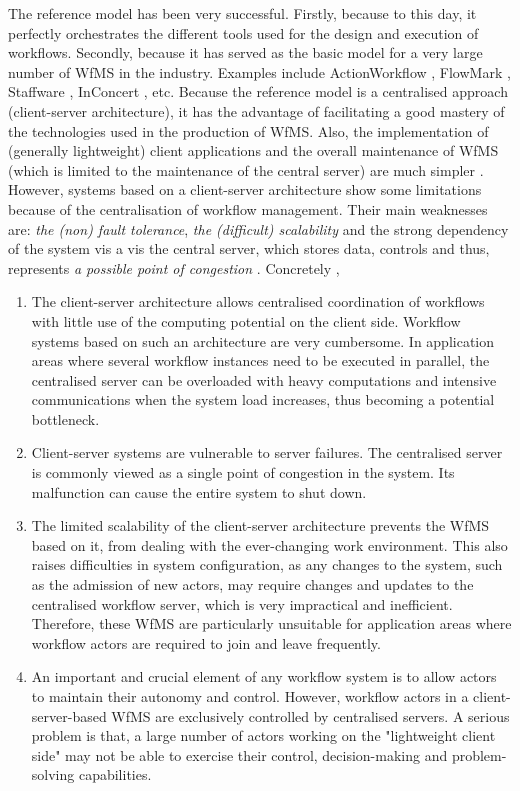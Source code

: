 The reference model has been very successful. Firstly, because to this day, it perfectly orchestrates the different tools used for the design and execution of workflows. Secondly, because it has served as the basic model for a very large number of WfMS in the industry. Examples include ActionWorkflow \cite{actionWorkflow}, FlowMark \cite{flowmark}, Staffware \cite{staffware}, InConcert \cite{inConcert}, etc. Because the reference model is a centralised approach (client-server architecture), it has the advantage of facilitating a good mastery of the technologies used in the production of WfMS. Also, the implementation of (generally lightweight) client applications and the overall maintenance of WfMS (which is limited to the maintenance of the central server) are much simpler \cite{theseKanzow}. However, systems based on a client-server architecture show some limitations because of the centralisation of workflow management. Their main weaknesses are: \textit{the (non) fault tolerance}, \textit{the (difficult) scalability} and the strong dependency of the system vis a vis the central server, which stores data, controls and thus, represents \textit{a possible point of congestion} \cite{junYan06, fakas04}. Concretely \cite{junYan06},
\begin{enumerate}
	\item The client-server architecture allows centralised coordination of workflows with little use of the computing potential on the client side. Workflow systems based on such an architecture are very cumbersome. In application areas where several workflow instances need to be executed in parallel, the centralised server can be overloaded with heavy computations and intensive communications when the system load increases, thus becoming a potential bottleneck. 
	\item Client-server systems are vulnerable to server failures. The centralised server is commonly viewed as a single point of congestion in the system. Its malfunction can cause the entire system to shut down. 
	\item The limited scalability of the client-server architecture prevents the WfMS based on it, from dealing with the ever-changing work environment. This also raises difficulties in system configuration, as any changes to the system, such as the admission of new actors, may require changes and updates to the centralised workflow server, which is very impractical and inefficient. Therefore, these WfMS are particularly unsuitable for application areas where workflow actors are required to join and leave frequently.
	\item An important and crucial element of any workflow system is to allow actors to maintain their autonomy and control. However, workflow actors in a client-server-based WfMS are exclusively controlled by centralised servers. A serious problem is that, a large number of actors working on the "lightweight client side" may not be able to exercise their control, decision-making and problem-solving capabilities.
\end{enumerate}

